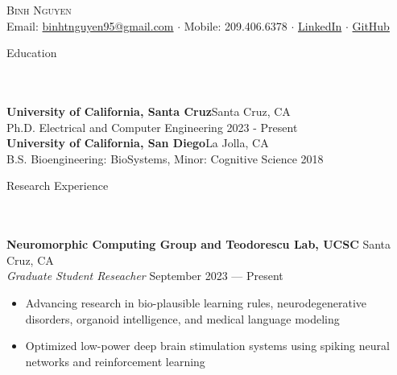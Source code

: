 \documentclass{article}
\newcommand{\lineunder} {
    \vspace*{-8pt} \\
    \hspace*{-18pt} \hrulefill \\
}
\newcommand{\header} [1] {
    {\hspace*{-18pt}\vspace*{6pt} \Large{#1} }
    \vspace*{-6pt} 
    \lineunder
}
\begin{document}

\vspace*{-50pt}


\begin{center}
	{\Huge \scshape {Binh Nguyen}}\\
	\vspace{2mm}
	Email: \href{mailto:binhtnguyen95@gmail.com}{binhtnguyen95@gmail.com} $\cdot$
	Mobile: 209.406.6378 $\cdot$ 
	\href{https://www.linkedin.com/in/binh-t-nguyen} {LinkedIn} $\cdot$ 
	\href{https://www.github.com/howyoubinh}{GitHub}
\end{center}

\header{Education}
\textbf{University of California, Santa Cruz}\hfill Santa Cruz, CA \\
Ph.D. Electrical and Computer Engineering \hfill 2023 - Present \\ 
\vspace{2mm}
\textbf{University of California, San Diego}\hfill La Jolla, CA\\
B.S. Bioengineering: BioSystems, Minor: Cognitive Science \hfill 2018\\
\vspace{7mm}

\header{Research Experience}

\textbf{Neuromorphic Computing Group and Teodorescu Lab, UCSC} \hfill Santa Cruz, CA\\
\textit{Graduate Student Reseacher} \hfill September 2023 --- Present\\
\vspace{-2mm}
\begin{itemize} \itemsep 0.05pt
	\item Advancing research in bio-plausible learning rules, neurodegenerative disorders, organoid intelligence, and medical language modeling
        \item Optimized low-power deep brain stimulation systems using spiking neural networks and reinforcement learning
\end{itemize}
\end{document}
